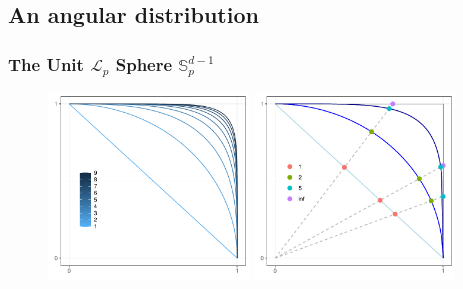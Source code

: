 \documentclass[aspectratio=169]{beamer}
\begin{document}
\subsection{An angular distribution}
\begin{frame}
  \frametitle{The Unit $\mathcal{L}_p$ Sphere ${\mathbb S}_p^{d-1}$}
  \begin{figure}
     \includegraphics[width=0.475\textwidth]{./images/p_sphere}
     \hfill
     \includegraphics[width=0.475\textwidth]{./images/p_project}
  \end{figure}
\end{frame}
\end{document}

